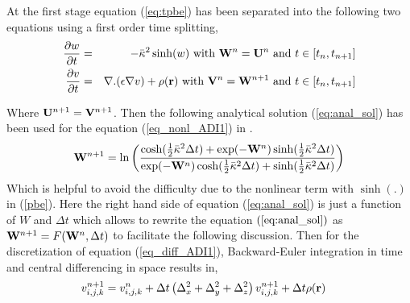 At the first stage equation (\ref{eq:tpbe}) has been separated into the following two equations using a first order time splitting,
\begin{eqnarray}
  \frac{\partial w}{\partial t}&=& -\bar\kappa^2 \sinh(w) \text{ with } {\bf W}^n={\bf U}^n\text{ and } t \in \left[t_n,t_{n+1}\right]\label{eq_nonl_ADI1}\\
 \frac{\partial v}{\partial t}&=&  \nabla . (\epsilon\nabla v)+\rho({\bf r}) \text{ with } {\bf V}^n={\bf W}^{n+1}\text{ and } t \in \left[t_n,t_{n+1}\right]	 \label{eq_diff_ADI1}
\end{eqnarray}  





Where ${\bf U}^{n+1}={\bf V}^{n+1}$. Then the following analytical solution (\ref{eq:anal_sol})  has been used for the equation (\ref{eq_nonl_ADI1}) in \cite{Geng2013_Fully}.
	\begin{eqnarray}	
{\bf W}^{n+1}= \ln \left( \frac{\cosh(\frac{1}{2}\bar\kappa^2\Delta t)+\exp(-{\bf W}^n)\sinh(\frac{1}{2}\bar\kappa^2\Delta t)}{\exp(-{\bf W}^n)\cosh(\frac{1}{2}\bar\kappa^2\Delta t)+\sinh(\frac{1}{2}\bar\kappa^2\Delta t)}\right)\label{eq:anal_sol}
\end{eqnarray}
Which is helpful to avoid the difficulty due to the nonlinear term with $\sinh(.)$ in (\ref{pbe}). Here the right hand side of equation (\ref{eq:anal_sol}) is just a function of $W$ and $\Delta t$ which allows to rewrite the equation $(\ref{eq:anal_sol})$ as ${\bf W}^{n+1}=F({\bf W}^n,\Delta t)$ to facilitate the following discussion. Then for the discretization of equation (\ref{eq_diff_ADI1}), Backward-Euler integration in time and central differencing in space results in, 
\begin{eqnarray}
	v_{i,j,k}^{n+1} &=v_{i,j,k}^{n}+\Delta t \left(\Delta_x^2+\Delta_y^2+\Delta_z^2\right)v_{i,j,k}^{n+1}+\Delta t \rho({\bf r}) \label{eq:imp_ADI}
\end{eqnarray}

